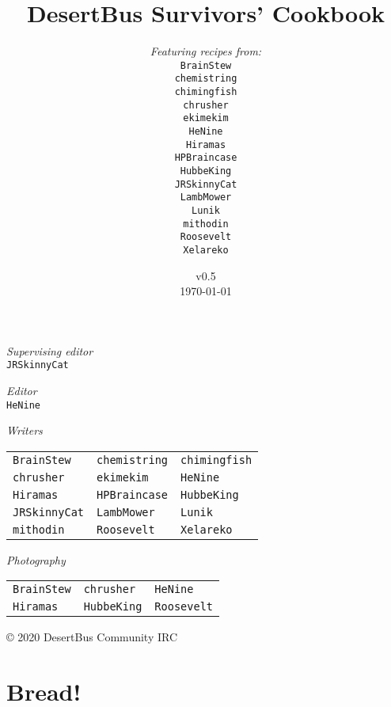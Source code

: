 \documentclass[12pt,a4paper,twoside]{book}
\title{DesertBus Survivors' Cookbook}
\author{\textit{Featuring recipes from:}\\
		\texttt{BrainStew}\\%
		\texttt{chemistring}\\%
		\texttt{chimingfish}\\%
		\texttt{chrusher}\\%
		\texttt{ekimekim}\\%
		\texttt{HeNine}\\%
		\texttt{Hiramas}\\%
		\texttt{HPBraincase}\\%
		\texttt{HubbeKing}\\%
		\texttt{JRSkinnyCat}\\%
		\texttt{LambMower}\\%
		\texttt{Lunik}\\%
		\texttt{mithodin}\\%
		\texttt{Roosevelt}\\%
		\texttt{Xelareko}
}
\date{{\Large v0.5}\\\vspace{1em}\today}
\begin{document}
	\frontmatter
	\maketitle

	\newpage

	\null
	\vfill

	\textit{Supervising editor}\\
	\texttt{JRSkinnyCat}

	\textit{Editor}\\
	\texttt{HeNine}


	\textit{Writers}\\

	\vspace{-1.9em}
	\hspace*{-0.45em}\begin{tabular}{lll}
	\texttt{BrainStew} &
	\texttt{chemistring} &
	\texttt{chimingfish}\\
	\texttt{chrusher} &
	\texttt{ekimekim} &
	\texttt{HeNine}\\
	\texttt{Hiramas} &
	\texttt{HPBraincase} &
	\texttt{HubbeKing}\\
	\texttt{JRSkinnyCat} &
	\texttt{LambMower} &
	\texttt{Lunik}\\
	\texttt{mithodin} &
	\texttt{Roosevelt} &
	\texttt{Xelareko}
	\end{tabular}

	\textit{Photography}\\

	\vspace{-1.em}
	\hspace*{-0.45em}\begin{tabular}{lll}
		\texttt{BrainStew} &
		\texttt{chrusher} &
		\texttt{HeNine}\\
		\texttt{Hiramas} &
		\texttt{HubbeKing} &
		\texttt{Roosevelt}
	\end{tabular}

	\vspace{1in}
	© 2020 DesertBus Community IRC

	\newpage
	\newpage
	\tableofcontents
	\clearpage

	\mainmatter
	\chapter{Bread!}
	\clearpage

	
	\clearpage
	
	\clearpage
	
	\clearpage
\end{document}
